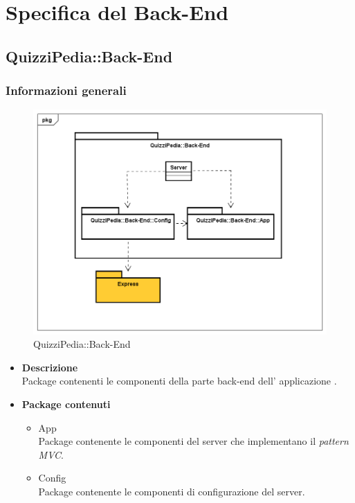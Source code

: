\newpage
\section{Specifica del Back-End}
\subsection{QuizziPedia::Back-End}
\subsubsection{Informazioni generali}
\label{QuizziPedia::Back-End}
\begin{figure}
	\centering
	\includegraphics[scale=0.45]{UML/Package/QuizziPedia_Back-End.png}
	\caption{QuizziPedia::Back-End}
\end{figure}

	\begin{itemize}
		\item \textbf{Descrizione} \\ Package contenenti le componenti della parte back-end dell' applicazione .
		\item \textbf{Package contenuti}
		\begin{itemize}
			\item App \\
			Package contenente le componenti del server che implementano il \textit{pattern MVC}.
			\item Config \\
			Package contenente le componenti di configurazione del server.
		\end{itemize}
	\end{itemize}
